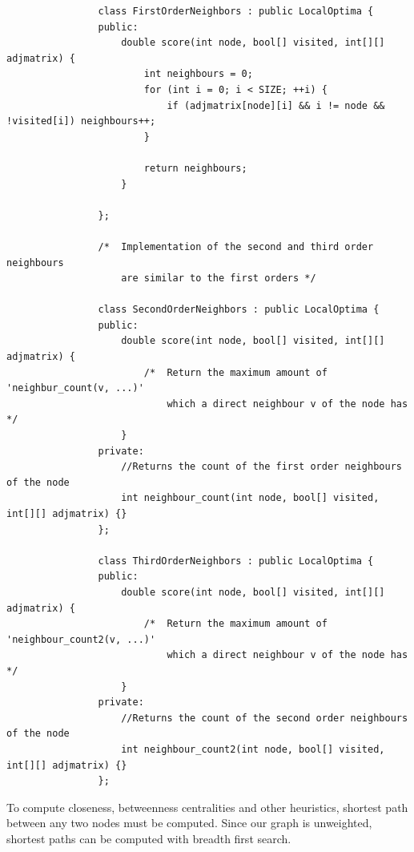 \documentclass[12pt]{report}
\begin{document}
            \begin{verbatim}
                class FirstOrderNeighbors : public LocalOptima {
                public:
                    double score(int node, bool[] visited, int[][] adjmatrix) {
                        int neighbours = 0;
                        for (int i = 0; i < SIZE; ++i) {
                            if (adjmatrix[node][i] && i != node && !visited[i]) neighbours++;
                        }

                        return neighbours;
                    }
                                        
                };

                /*  Implementation of the second and third order neighbours 
                    are similar to the first orders */

                class SecondOrderNeighbors : public LocalOptima {
                public:
                    double score(int node, bool[] visited, int[][] adjmatrix) {
                        /*  Return the maximum amount of 'neighbur_count(v, ...)'
                            which a direct neighbour v of the node has */
                    }
                private:
                    //Returns the count of the first order neighbours of the node 
                    int neighbour_count(int node, bool[] visited, int[][] adjmatrix) {}
                };

                class ThirdOrderNeighbors : public LocalOptima {
                public:
                    double score(int node, bool[] visited, int[][] adjmatrix) {
                        /*  Return the maximum amount of 'neighbour_count2(v, ...)' 
                            which a direct neighbour v of the node has */
                    }
                private:
                    //Returns the count of the second order neighbours of the node 
                    int neighbour_count2(int node, bool[] visited, int[][] adjmatrix) {}
                };
            \end{verbatim}

            To compute closeness, betweenness centralities and other heuristics, shortest path between any two nodes must be computed. Since our graph is 
            unweighted, shortest paths can be computed with breadth first search.
\end{document}
